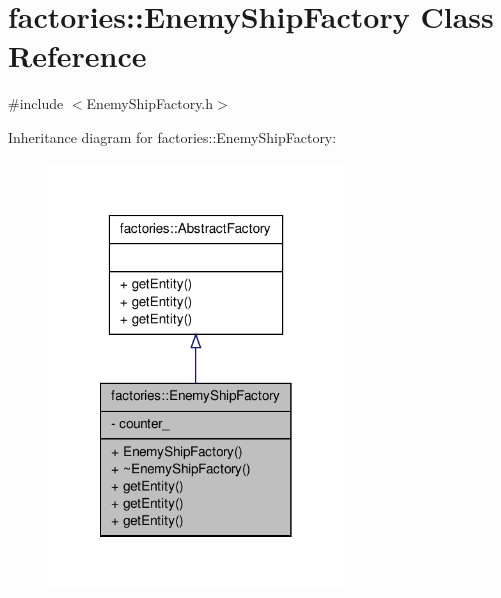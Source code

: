 \hypertarget{classfactories_1_1EnemyShipFactory}{\section{factories\-:\-:\-Enemy\-Ship\-Factory \-Class \-Reference}
\label{d4/df0/classfactories_1_1EnemyShipFactory}
}


{\ttfamily \#include $<$\-Enemy\-Ship\-Factory.\-h$>$}



\-Inheritance diagram for factories\-:\-:\-Enemy\-Ship\-Factory\-:
\nopagebreak
\begin{figure}[H]
\begin{center}
\leavevmode
\includegraphics[width=222pt]{d5/dee/classfactories_1_1EnemyShipFactory__inherit__graph}
\end{center}
\end{figure}


